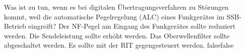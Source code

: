     {Was ist zu tun, wenn es bei digitalen Übertragungsverfahren zu Störungen kommt, weil die automatische Pegelregelung (ALC) eines Funkgerätes im SSB-Betrieb eingreift?}
    {Der NF-Pegel am Eingang des Funkgerätes sollte reduziert werden.}
    {Die Sendeleistung sollte erhöht werden.}
    {Das Oberwellenfilter sollte abgeschaltet werden.}
    {Es sollte mit der RIT gegengesteuert werden.}
    {false}{false}
